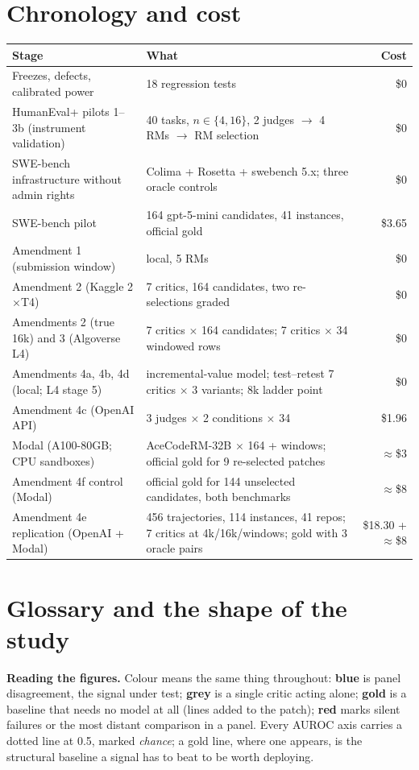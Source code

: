 \documentclass[11pt]{article}
\begin{document}
\section{Chronology and cost}
\footnotesize
\begin{tabularx}{\linewidth}{lXr}\toprule
Stage & What & Cost \\\midrule
Freezes, defects, calibrated power & 18 regression tests & \$0 \\
HumanEval+ pilots 1--3b (instrument validation) & 40 tasks, $n\in\{4,16\}$, 2 judges $\to$ 4 RMs $\to$ RM selection & \$0 \\
SWE-bench infrastructure without admin rights & Colima + Rosetta + swebench 5.x; three oracle controls & \$0 \\
SWE-bench pilot & 164 gpt-5-mini candidates, 41 instances, official gold & \$3.65 \\
Amendment 1 (submission window) & local, 5 RMs & \$0 \\
Amendment 2 (Kaggle 2$\times$T4) & 7 critics, 164 candidates, two re-selections graded & \$0 \\
Amendments 2 (true 16k) and 3 (Algoverse L4) & 7 critics $\times$ 164 candidates; 7 critics $\times$ 34 windowed rows & \$0 \\
Amendments 4a, 4b, 4d (local; L4 stage 5) & incremental-value model; test--retest 7 critics $\times$ 3 variants; 8k ladder point & \$0 \\
Amendment 4c (OpenAI API) & 3 judges $\times$ 2 conditions $\times$ 34 & \$1.96 \\
Modal (A100-80GB; CPU sandboxes) & AceCodeRM-32B $\times$ 164 + windows; official gold for 9 re-selected patches & $\approx$\$3 \\
Amendment 4f control (Modal) & official gold for 144 unselected candidates, both benchmarks & $\approx$\$8 \\
Amendment 4e replication (OpenAI + Modal) & 456 trajectories, 114 instances, 41 repos; 7 critics at 4k/16k/windows; gold with 3 oracle pairs & \$18.30 + $\approx$\$8 \\\bottomrule
\end{tabularx}

\section{Glossary and the shape of the study}
\footnotesize
\textbf{Reading the figures.} Colour means the same thing throughout: \textcolor[HTML]{2b6cb0}{\textbf{blue}} is panel disagreement, the signal under test; \textcolor[HTML]{7f8c8d}{\textbf{grey}} is a single critic acting alone; \textcolor[HTML]{b7791f}{\textbf{gold}} is a baseline that needs no model at all (lines added to the patch); \textcolor[HTML]{c0392b}{\textbf{red}} marks silent failures or the most distant comparison in a panel. Every AUROC axis carries a dotted line at 0.5, marked \emph{chance}; a gold line, where one appears, is the structural baseline a signal has to beat to be worth deploying.
\end{document}
